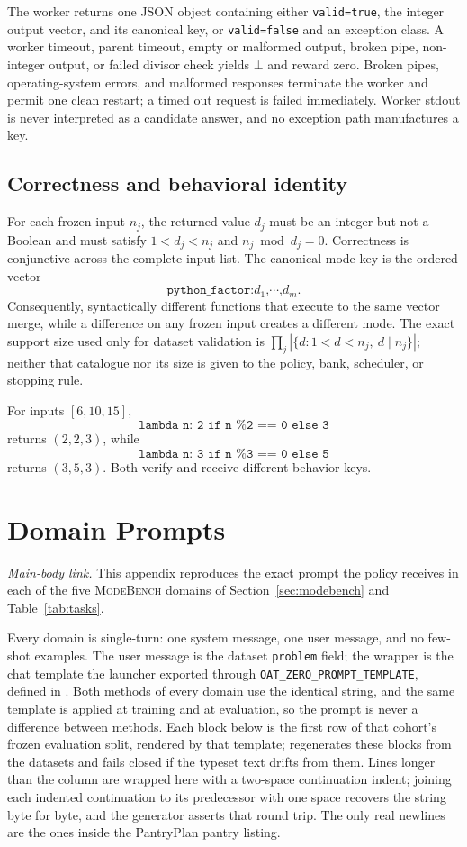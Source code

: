 \documentclass{article}
\newcommand{\1}{\mathbf 1}
\newcommand{\mb}{\textsc{ModeBench}}
\theoremstyle{remark}
\theoremstyle{definition}
\theoremstyle{plain}
\begin{document}
The worker returns one JSON object containing either
\texttt{valid=true}, the integer output vector, and its canonical key, or
\texttt{valid=false} and an exception class. A worker timeout, parent timeout,
empty or malformed output, broken pipe, non-integer output, or failed divisor
check yields $\bot$ and reward zero. Broken pipes, operating-system errors, and
malformed responses terminate the worker and permit one clean restart; a timed
out request is failed immediately. Worker stdout is never interpreted as a
candidate answer, and no exception path manufactures a key.

\subsection{Correctness and behavioral identity}
\label{app:python-identity}

For each frozen input $n_j$, the returned value $d_j$ must be an integer but
not a Boolean and must satisfy $1<d_j<n_j$ and
$n_j\bmod d_j=0$. Correctness is conjunctive across the complete input list.
The canonical mode key is the ordered vector
\[
  \texttt{python\_factor:}d_1\texttt{,}\cdots\texttt{,}d_m .
\]
Consequently, syntactically different functions that execute to the same
vector merge, while a difference on any frozen input creates a different
mode. The exact support size used only for dataset validation is
$\prod_j |\{d:1<d<n_j,\ d\mid n_j\}|$; neither that catalogue nor its size is
given to the policy, bank, scheduler, or stopping rule.

For inputs $[6,10,15]$,
\[
\texttt{lambda n: 2 if n \% 2 == 0 else 3}
\]
returns $(2,2,3)$, while
\[
\texttt{lambda n: 3 if n \% 3 == 0 else 5}
\]
returns $(3,5,3)$. Both verify and receive different behavior keys.

\clearpage
\section{Domain Prompts}
\label{app:prompts}

\noindent\emph{Main-body link.} This appendix reproduces the exact prompt the
policy receives in each of the five \mb{} domains of
Section~\ref{sec:modebench} and Table~\ref{tab:tasks}.

Every domain is single-turn: one system message, one user message, and no
few-shot examples. The user message is the dataset \texttt{problem} field; the
wrapper is the chat template the launcher exported through
\texttt{OAT\_ZERO\_PROMPT\_TEMPLATE}, defined in
. Both methods of every domain use the identical
string, and the same template is applied at training and at evaluation, so the
prompt is never a difference between methods. Each block below is the first row of
that cohort's frozen evaluation split, rendered by that template;
 regenerates these blocks from the
datasets and fails closed if the typeset text drifts from them. Lines longer
than the column are wrapped here with a two-space continuation indent; joining
each indented continuation to its predecessor with one space recovers the
string byte for byte, and the generator asserts that round trip. The only real
newlines are the ones inside the PantryPlan pantry listing.
\end{document}
